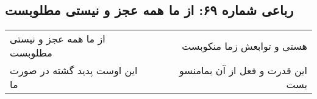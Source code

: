 \begin{center}
\section*{رباعی شماره ۶۹: از ما همه عجز و نیستی مطلوبست}
\label{sec:sh069}
\begin{longtable}{l p{0.5cm} r}
از ما همه عجز و نیستی مطلوبست
&&
هستی و توابعش زما منکوبست
\\
این اوست پدید گشته در صورت ما
&&
این قدرت و فعل از آن بمامنسو بست
\\
\end{longtable}
\end{center}
